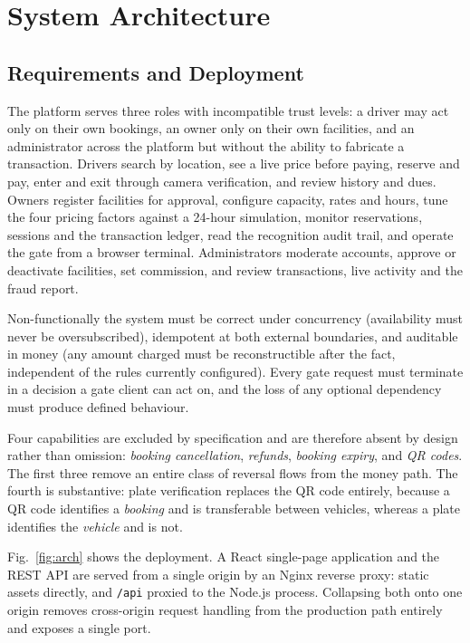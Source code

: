 \documentclass[journal,onecolumn,11pt]{IEEEtran}
\begin{document}
\section{System Architecture}
\label{sec:architecture}

\subsection{Requirements and Deployment}

The platform serves three roles with incompatible trust levels: a driver may
act only on their own bookings, an owner only on their own facilities, and an
administrator across the platform but without the ability to fabricate a
transaction. Drivers search by location, see a live price before paying,
reserve and pay, enter and exit through camera verification, and review history
and dues. Owners register facilities for approval, configure capacity, rates
and hours, tune the four pricing factors against a 24-hour simulation, monitor
reservations, sessions and the transaction ledger, read the recognition audit
trail, and operate the gate from a browser terminal. Administrators moderate
accounts, approve or deactivate facilities, set commission, and review
transactions, live activity and the fraud report.

Non-functionally the system must be correct under concurrency (availability
must never be oversubscribed), idempotent at both external boundaries, and
auditable in money (any amount charged must be reconstructible after the fact,
independent of the rules currently configured). Every gate request must
terminate in a decision a gate client can act on, and the loss of any optional
dependency must produce defined behaviour.

Four capabilities are excluded by specification and are therefore absent by
design rather than omission: \emph{booking cancellation}, \emph{refunds},
\emph{booking expiry}, and \emph{QR codes}. The first three remove an entire
class of reversal flows from the money path. The fourth is substantive: plate
verification replaces the QR code entirely, because a QR code identifies a
\emph{booking} and is transferable between vehicles, whereas a plate identifies
the \emph{vehicle} and is not.

Fig.~\ref{fig:arch} shows the deployment. A React single-page application and
the REST API are served from a single origin by an Nginx reverse proxy: static
assets directly, and \texttt{/api} proxied to the Node.js process. Collapsing
both onto one origin removes cross-origin request handling from the production
path entirely and exposes a single port.
\end{document}
